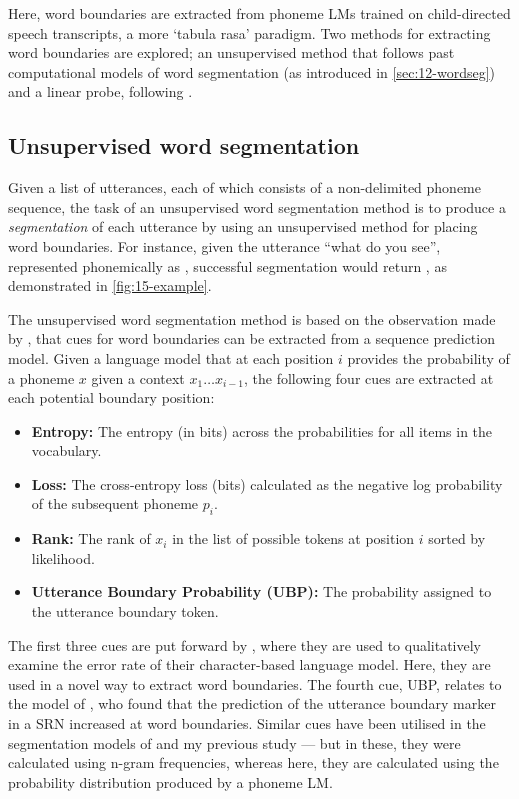 Here, word boundaries are extracted from phoneme LMs trained on child-directed speech transcripts, a more `tabula rasa' paradigm. Two methods for extracting word boundaries are explored; an unsupervised method that follows past computational models of word segmentation (as introduced in \cref{sec:12-wordseg}) and a linear probe, following \citet{hahn-baroni-2019-tabula}.

\subsection{Unsupervised word segmentation}

Given a list of utterances, each of which consists of a non-delimited phoneme sequence, the task of an unsupervised word segmentation method is to produce a \emph{segmentation} of each utterance by using an unsupervised method for placing word boundaries. For instance, given the utterance ``what do you see'', represented phonemically as , successful segmentation would return , as demonstrated in \cref{fig:15-example}.

The unsupervised word segmentation method is based on the observation made by \citet{elman-1990-finding}, that cues for word boundaries can be extracted from a sequence prediction model. Given a language model that at each position $i$ provides the probability of a phoneme $x$ given a context $x_1\ldots x_{i-1}$, the following four cues are extracted at each potential boundary position:

\begin{itemize}[leftmargin=*]
    \item \textbf{Entropy:} The entropy (in bits) across the probabilities for all items in the vocabulary.%
    \item \textbf{Loss:} The cross-entropy loss (bits) calculated as the negative log probability of the subsequent phoneme $p_i$.
    \item \textbf{Rank:} The rank of $x_i$ in the list of possible tokens at position $i$ sorted by likelihood.
    \item \textbf{Utterance Boundary Probability (UBP):} The probability assigned to the utterance boundary token.
\end{itemize}

The first three cues are put forward by \citet{al-rfou_character-level_2019}, where they are used to qualitatively examine the error rate of their character-based language model. Here, they are used in a novel way to extract word boundaries. The fourth cue, UBP, relates to the model of \citet{christiansen1998learning}, who found that the prediction of the utterance boundary marker in a SRN increased at word boundaries. Similar cues have been utilised in the segmentation models of \citet{ccoltekin2014explicit} and my previous study \citep{goriely2023word} --- but in these, they were calculated using n-gram frequencies, whereas here, they are calculated using the probability distribution produced by a phoneme LM.

